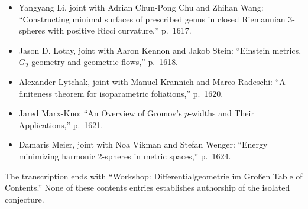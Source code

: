 \documentclass[11pt]{article}
\begin{document}
\begin{itemize}
\begin{itemize}
\item Yangyang Li, joint with Adrian Chun-Pong Chu and Zhihan Wang: ``Constructing minimal surfaces of prescribed genus in closed Riemannian 3-spheres with positive Ricci curvature,'' p.\ 1617.
\item Jason D. Lotay, joint with Aaron Kennon and Jakob Stein: ``Einstein metrics, \(G_2\) geometry and geometric flows,'' p.\ 1618.
\item Alexander Lytchak, joint with Manuel Krannich and Marco Radeschi: ``A finiteness theorem for isoparametric foliations,'' p.\ 1620.
\item Jared Marx-Kuo: ``An Overview of Gromov's \(p\)-widths and Their Applications,'' p.\ 1621.
\item Damaris Meier, joint with Noa Vikman and Stefan Wenger: ``Energy minimizing harmonic 2-spheres in metric spaces,'' p.\ 1624.
\end{itemize}
The transcription ends with ``Workshop: Differentialgeometrie im Großen Table of Contents.'' None of these contents entries establishes authorship of the isolated conjecture.
\end{itemize}
\end{document}
